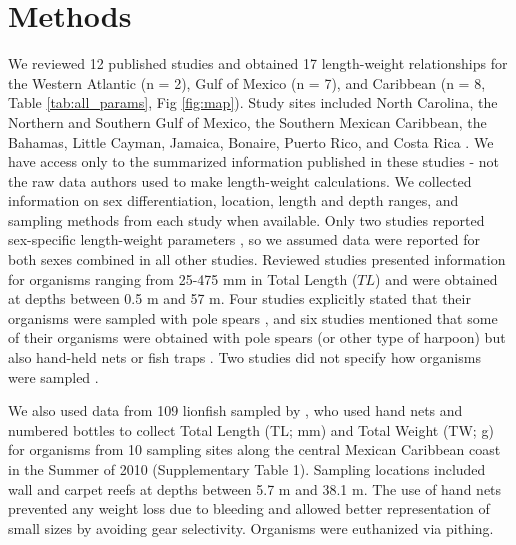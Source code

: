 \documentclass[fleqn,10pt,lineno]{wlpeerj} %
\begin{document}
\section*{Methods}

We reviewed 12 published studies and obtained 17 length-weight
relationships for the Western Atlantic (n = 2), Gulf of Mexico (n = 7),
and Caribbean (n = 8, Table \ref{tab:all_params}, Fig \ref{fig:map}).
Study sites included North Carolina, the Northern and Southern Gulf of
Mexico, the Southern Mexican Caribbean, the Bahamas, Little Cayman,
Jamaica, Bonaire, Puerto Rico, and Costa Rica
\citep{barbour_2011,darling_2011,deleon_2013,fogg_2013,dahl_2014,edwards_2014,toledohernndez_2014,sandel_2015,aguilarperera_2016,sabidoitza_2016,sabidoitz_2016,chin_2016}.
We have access only to the summarized information published in these
studies - not the raw data authors used to make length-weight
calculations. We collected information on sex differentiation, location,
length and depth ranges, and sampling methods from each study when
available. Only two studies reported sex-specific length-weight
parameters \citep{aguilarperera_2016,fogg_2013}, so we assumed data were
reported for both sexes combined in all other studies. Reviewed studies
presented information for organisms ranging from 25-475 mm in Total
Length (\(TL\)) and were obtained at depths between 0.5 m and 57 m. Four
studies explicitly stated that their organisms were sampled with pole
spears \citep{dahl_2014,aguilarperera_2016,chin_2016,sabidoitz_2016},
and six studies mentioned that some of their organisms were obtained
with pole spears (or other type of harpoon) but also hand-held nets or
fish traps
\citep{barbour_2011,fogg_2013,edwards_2014,toledohernndez_2014,sandel_2015,sabidoitza_2016}.
Two studies did not specify how organisms were sampled
\citep{darling_2011,deleon_2013}.

We also used data from 109 lionfish sampled by
\citet{villaseorderbez_2014}, who used hand nets and numbered bottles to
collect Total Length (TL; mm) and Total Weight (TW; g) for organisms
from 10 sampling sites along the central Mexican Caribbean coast in the
Summer of 2010 (Supplementary Table 1). Sampling locations included wall
and carpet reefs at depths between 5.7 m and 38.1 m. The use of hand
nets prevented any weight loss due to bleeding and allowed better
representation of small sizes by avoiding gear selectivity. Organisms
were euthanized via pithing.
\end{document}
